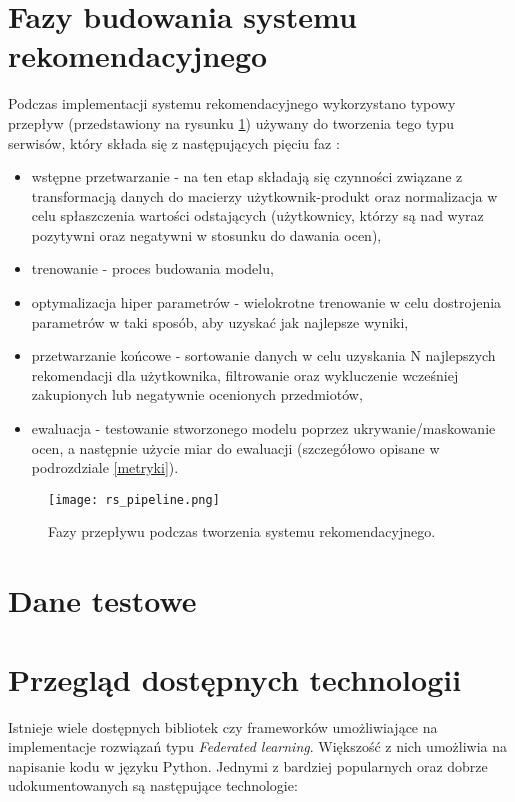 \section{Fazy budowania systemu rekomendacyjnego}

Podczas implementacji systemu rekomendacyjnego wykorzystano typowy przepływ (przedstawiony na rysunku \ref{fig:rs_pipeline}) używany do tworzenia tego typu serwisów, który składa się z następujących pięciu faz \cite{rs_in_real}:
\begin{itemize}
    \item wstępne przetwarzanie - na ten etap składają się czynności związane z transformacją danych do macierzy użytkownik-produkt oraz normalizacja w celu spłaszczenia wartości odstających (użytkownicy, którzy są nad wyraz pozytywni oraz negatywni w stosunku do dawania ocen),
    \item trenowanie - proces budowania modelu,
    \item optymalizacja hiper parametrów - wielokrotne trenowanie w celu dostrojenia parametrów w taki sposób, aby uzyskać jak najlepsze wyniki,
    \item przetwarzanie końcowe - sortowanie danych w celu uzyskania N najlepszych rekomendacji dla użytkownika, filtrowanie oraz wykluczenie wcześniej zakupionych lub negatywnie ocenionych przedmiotów,
    \item ewaluacja - testowanie stworzonego modelu poprzez ukrywanie/maskowanie ocen, a następnie użycie miar do ewaluacji (szczegółowo opisane w podrozdziale \ref{metryki}).
\end{itemize}{}

\begin{figure}
    \texttt{[image: rs\_pipeline.png]}
    \caption{Fazy przepływu podczas tworzenia systemu rekomendacyjnego.}
    \label{fig:rs_pipeline}
\end{figure}

\section{Dane testowe}

\section{Przegląd dostępnych technologii}

Istnieje wiele dostępnych bibliotek czy frameworków umożliwiające na implementacje rozwiązań typu \textit{Federated learning}. Większość z nich umożliwia na napisanie kodu w języku Python. Jednymi z bardziej popularnych oraz dobrze udokumentowanych są następujące technologie:

